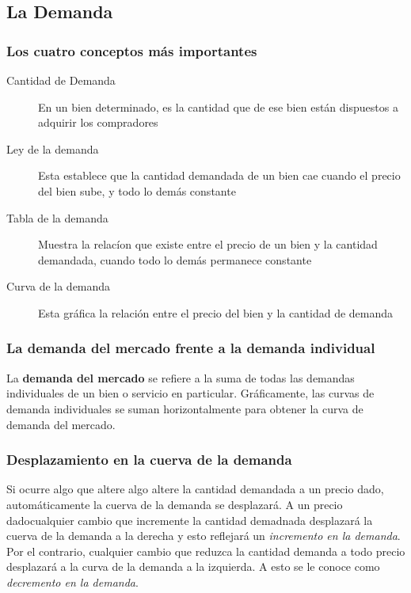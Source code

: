 \subsection{La Demanda}
\subsubsection{Los cuatro conceptos más importantes}
\begin{description}
\item[Cantidad de Demanda] En un bien determinado, es la cantidad que de ese bien están dispuestos a adquirir los compradores
\item[Ley de la demanda] Esta establece que la cantidad demandada de un bien cae cuando el precio del bien sube, y todo lo demás constante 
\item[Tabla de la demanda] Muestra la relacíon que existe entre el precio de un bien y la cantidad demandada, cuando todo lo demás permanece constante
\item[Curva de la demanda] Esta gráfica la relación entre el precio del bien y la cantidad de demanda  
\end{description}

\subsubsection{La demanda del mercado frente a la demanda individual}
La {\bf demanda del mercado} se refiere a la suma de todas las demandas individuales de un bien o servicio en particular. Gráficamente, las curvas de demanda individuales se suman horizontalmente para obtener la curva de demanda del mercado.

\subsubsection{Desplazamiento en la cuerva de la demanda}

Si ocurre algo que altere algo altere la cantidad demandada a un precio dado, automáticamente la cuerva de la demanda se desplazará. A un precio dadocualquier cambio que incremente la cantidad demadnada desplazará la cuerva de la demanda a la derecha y esto reflejará un \textit{incremento en la demanda}. Por el contrario, cualquier cambio que reduzca la cantidad demanda a todo precio desplazará a la curva de la demanda a la izquierda. A esto se le conoce como \textit{decremento en la demanda}.

